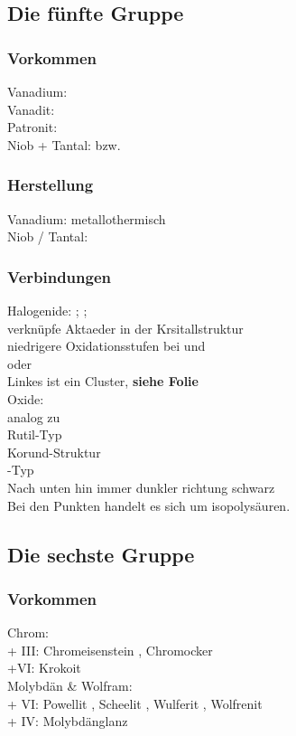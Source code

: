 \documentclass{article}
\begin{document}
\subsection{Die fünfte Gruppe}
\subsubsection{Vorkommen}
Vanadium:\\
Vanadit: \\
Patronit: \\
Niob + Tantal:  bzw. \\
\subsubsection{Herstellung}
Vanadium:  metallothermisch\\
Niob / Tantal: \\
\subsubsection{Verbindungen}
Halogenide: ; ;\\
verknüpfe Aktaeder in der Krsitallstruktur\\
niedrigere Oxidationsstufen bei  und \\
 oder \\
Linkes ist ein Cluster, \textbf{siehe Folie}\\
Oxide:\\
 analog zu  \\
 Rutil-Typ\\
 Korund-Struktur\\
 -Typ\\
Nach unten hin immer dunkler richtung schwarz\\
Bei den Punkten handelt es sich um isopolysäuren.
\subsection{Die sechste Gruppe}
\subsubsection{Vorkommen}
Chrom:\\
+ III: Chromeisenstein , Chromocker \\
+VI: Krokoit \\
Molybdän \& Wolfram:\\
+ VI: Powellit , Scheelit , Wulferit , Wolfrenit \\
+ IV: Molybdänglanz 
\end{document}
